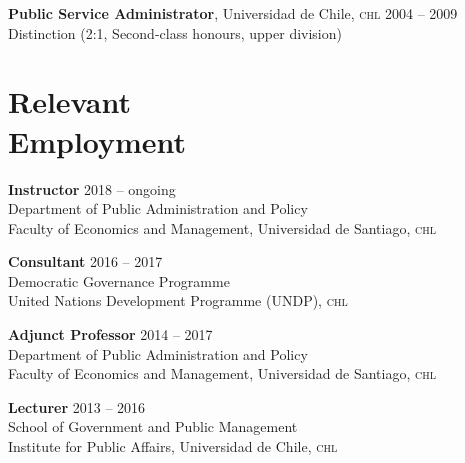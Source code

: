 \documentclass[letterpaper,margin]{res}
\begin{document}
\begin{resume}
{\small {\bfseries Public Service Administrator}, Universidad de Chile, {\scshape chl}}  \hfill {\small 2004 -- 2009}\\
{\small Distinction (2:1, Second-class honours, upper division)}


 \section{\footnotesize Relevant \\ Employment}
 
 
{\bf \small Instructor} \hfill {\small 2018 -- ongoing}\\
{\small Department of Public Administration and Policy}\\
{\small Faculty of Economics and Management, Universidad de Santiago, {\scshape chl}}

{\bf \small Consultant} \hfill {\small 2016 -- 2017}\\
{\small Democratic Governance Programme}\\
{\small United Nations Development Programme ({\scshape UNDP}), {\scshape chl}}

{\small \bf Adjunct Professor} \hfill {\small 2014 -- 2017}\\
{\small Department of Public Administration and Policy}\\
{\small Faculty of Economics and Management, Universidad de Santiago, {\scshape chl}}

{\small \bf Lecturer} \hfill {\small 2013 -- 2016}\\
{\small School of Government and Public Management}\\
{\small Institute for Public Affairs, Universidad de Chile, {\scshape chl}}


\end{resume}
\end{document}
